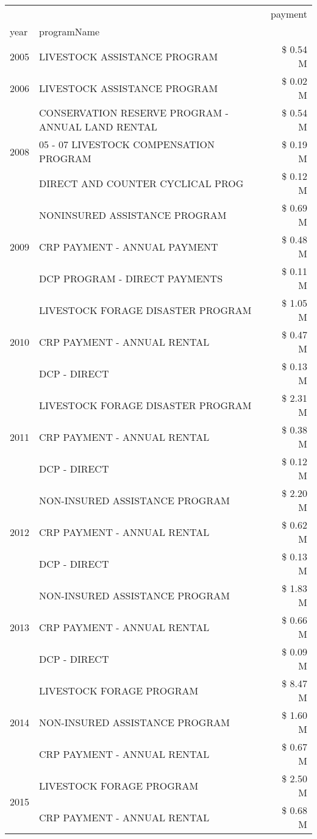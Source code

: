 \begin{tabular}{llr}
\toprule
 &  & payment \\
year & programName &  \\
\midrule
2005 & LIVESTOCK ASSISTANCE PROGRAM & \$ 0.54 M \\
\cline{1-3}
2006 & LIVESTOCK ASSISTANCE PROGRAM & \$ 0.02 M \\
\cline{1-3}
\multirow[t]{3}{*}{2008} & CONSERVATION RESERVE PROGRAM - ANNUAL LAND RENTAL & \$ 0.54 M \\
 & 05 - 07 LIVESTOCK COMPENSATION PROGRAM & \$ 0.19 M \\
 & DIRECT AND COUNTER CYCLICAL PROG & \$ 0.12 M \\
\cline{1-3}
\multirow[t]{3}{*}{2009} & NONINSURED ASSISTANCE PROGRAM & \$ 0.69 M \\
 & CRP PAYMENT - ANNUAL PAYMENT & \$ 0.48 M \\
 & DCP PROGRAM - DIRECT PAYMENTS & \$ 0.11 M \\
\cline{1-3}
\multirow[t]{3}{*}{2010} & LIVESTOCK FORAGE DISASTER PROGRAM & \$ 1.05 M \\
 & CRP PAYMENT - ANNUAL RENTAL & \$ 0.47 M \\
 & DCP - DIRECT & \$ 0.13 M \\
\cline{1-3}
\multirow[t]{3}{*}{2011} & LIVESTOCK FORAGE DISASTER PROGRAM & \$ 2.31 M \\
 & CRP PAYMENT - ANNUAL RENTAL & \$ 0.38 M \\
 & DCP - DIRECT & \$ 0.12 M \\
\cline{1-3}
\multirow[t]{3}{*}{2012} & NON-INSURED ASSISTANCE PROGRAM & \$ 2.20 M \\
 & CRP PAYMENT - ANNUAL RENTAL & \$ 0.62 M \\
 & DCP - DIRECT & \$ 0.13 M \\
\cline{1-3}
\multirow[t]{3}{*}{2013} & NON-INSURED ASSISTANCE PROGRAM & \$ 1.83 M \\
 & CRP PAYMENT - ANNUAL RENTAL & \$ 0.66 M \\
 & DCP - DIRECT & \$ 0.09 M \\
\cline{1-3}
\multirow[t]{3}{*}{2014} & LIVESTOCK FORAGE PROGRAM & \$ 8.47 M \\
 & NON-INSURED ASSISTANCE PROGRAM & \$ 1.60 M \\
 & CRP PAYMENT - ANNUAL RENTAL & \$ 0.67 M \\
\cline{1-3}
\multirow[t]{3}{*}{2015} & LIVESTOCK FORAGE PROGRAM & \$ 2.50 M \\
 & CRP PAYMENT - ANNUAL RENTAL & \$ 0.68 M \\

\end{tabular}
